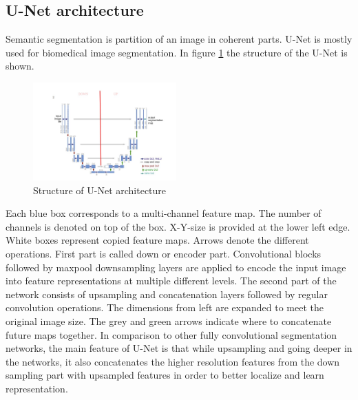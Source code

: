 \subsection{U-Net architecture}
Semantic segmentation is partition of an image in coherent parts. U-Net is mostly used for biomedical image segmentation. In figure \ref{unetstructure} the structure of the U-Net is shown.\newline
\begin{figure}[h!]
	\includegraphics[width=0.49\textwidth, angle=0]{files/unetstructure.jpg}
	\caption{Structure of U-Net architecture}
	\label{unetstructure}
\end{figure}

Each blue box corresponds to a multi-channel feature map. The number of channels is denoted on top of the box. X-Y-size is provided at the lower left edge. White boxes represent copied feature maps. Arrows denote the different operations.\newline
First part is called down or encoder part. Convolutional blocks followed by maxpool downsampling layers are applied to encode the input image into feature representations at multiple different levels. The second part of the network consists of upsampling and concatenation layers followed by regular convolution operations. The dimensions from left are expanded to meet the original image size. The grey and green arrows indicate where to concatenate future maps together.\newline
In comparison to other fully convolutional segmentation networks, the main feature of U-Net  is that while upsampling and going deeper in the networks, it also concatenates the higher resolution features from the down sampling part with upsampled features in order to better localize and learn representation.\newline


